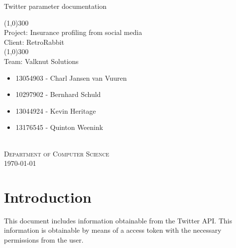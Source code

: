 \documentclass{article}
\begin{document}
	\begin{titlepage}
		\begin{center}
			\huge{
			Twitter parameter documentation\\
			}
			
			\line(1,0){300}\\
			[0.2cm]
			\LARGE{Project: Insurance profiling from social media\\
			Client: RetroRabbit} \\
			\line(1,0){300}\\
			\LARGE{Team: Valknut Solutions}\\
			[1.0cm]
			\large
			{
			\begin{itemize}
				\item 13054903 - Charl Jansen van Vuuren 
				\item 10297902 - Bernhard Schuld      
				\item 13044924 - Kevin Heritage
				\item 13176545 - Quinton Weenink\\
			\end{itemize}
			}
			\textsc{\large}\\
		[3.0cm]
		\textsc{\large  Department of Computer Science}\\
		[0.5cm]
		\textsc{\large \today}\\
		\end{center}

	\end{titlepage}
	\cleardoublepage
	\tableofcontents
	\cleardoublepage
\section{Introduction}
	This document includes information obtainable from the Twitter API. This information is obtainable by means of a access token with the necessary permissions from the user.
\end{document}
